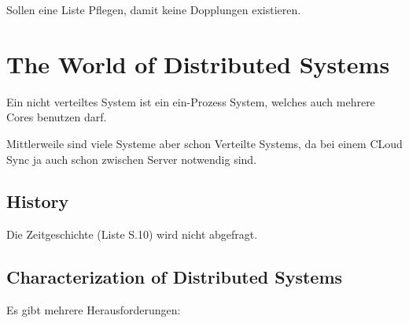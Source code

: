 \documentclass[a4paper]{article}
\begin{document}
Sollen eine Liste Pflegen, damit keine Dopplungen existieren.


\section{The World of Distributed Systems}

Ein nicht verteiltes System ist ein ein-Prozess System, welches auch mehrere Cores benutzen darf.

Mittlerweile sind viele Systeme aber schon Verteilte Systems, da bei einem CLoud Sync ja auch schon zwischen Server notwendig sind.

\subsection{History}

Die Zeitgeschichte (Liste S.10) wird nicht abgefragt.

\subsection{Characterization of Distributed Systems}

Es gibt mehrere Herausforderungen:
\end{document}
